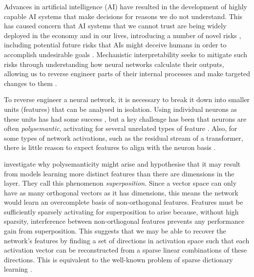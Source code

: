 Advances in artificial intelligence (AI) have resulted in the development of highly capable AI systems that make decisions for reasons we do not understand. This has caused concern that AI systems that we cannot trust are being widely deployed in the economy and in our lives, introducing a number of novel risks \citep{hendrycks2023overview}, including potential future risks that AIs might deceive humans in order to accomplish undesirable goals \citep{ngo2022alignment}. Mechanistic interpretability seeks to mitigate such risks through understanding how neural networks calculate their outputs, allowing us to reverse engineer parts of their internal processes and make targeted changes to them \citep{cammarata2021curve, wang2022interpretability, elhage2021mathematical}.

To reverse engineer a neural network, it is necessary to break it down into smaller units (features) that can be analysed in isolation. Using individual neurons as these units has had some success \citep{olah2020zoom, bills2023language}, but a key challenge has been that neurons are often \textit{polysemantic}, activating for several unrelated types of feature \citep{olah2020zoom}. Also, for some types of network activations, such as the residual stream of a transformer, there is little reason to expect features to align with the neuron basis \citep{elhage2023privileged}.

\citet{elhage2022toy} investigate why polysemanticity might arise and hypothesise that it may result from models learning more distinct features than there are dimensions in the layer. They call this phenomenon \textit{superposition}. Since a vector space can only have as many orthogonal vectors as it has dimensions, this means the network would learn an overcomplete basis of non-orthogonal features. Features must be sufficiently sparsely activating for superposition to arise because, without high sparsity, interference between non-orthogonal features prevents any performance gain from superposition. This suggests that we may be able to recover the network's features by finding a set of directions in activation space such that each activation vector can be reconstructed from a sparse linear combinations of these directions. This is equivalent to the well-known problem of sparse dictionary learning  \citep{olshausen1997sparse}. 


